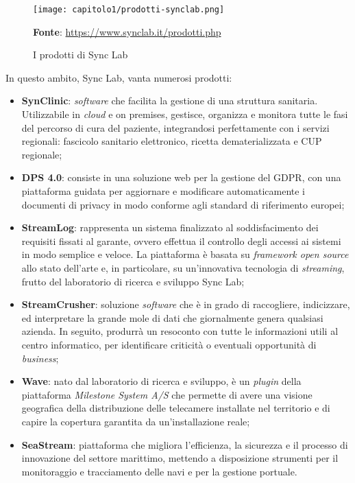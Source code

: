 \begin{figure}[!h]
  \centering
  \texttt{[image: capitolo1/prodotti-synclab.png]}
  \caption{I prodotti di Sync Lab}
  \textbf{Fonte}: \href{https://www.synclab.it/prodotti.php}{https://www.synclab.it/prodotti.php}
\end{figure}

In questo ambito, Sync Lab, vanta numerosi prodotti:
\begin{itemize}
  \item \textbf{SynClinic}: \emph{software} che facilita la gestione di una struttura sanitaria. Utilizzabile in \emph{cloud} e \gls{on premises}, gestisce, organizza e monitora tutte le fasi del percorso di cura del paziente, integrandosi perfettamente con i servizi regionali: fascicolo sanitario elettronico, ricetta dematerializzata e CUP regionale;
  
  \item \textbf{DPS 4.0}: consiste in una soluzione web per la gestione del GDPR, con una piattaforma guidata per aggiornare e modificare automaticamente i documenti di privacy in modo conforme agli standard di riferimento europei;
  
  \item \textbf{StreamLog}: rappresenta un sistema finalizzato al soddisfacimento dei requisiti fissati al garante, ovvero effettua il controllo degli accessi ai sistemi in modo semplice e veloce. La piattaforma è basata su \emph{framework open source} allo stato dell'arte e, in particolare, su un'innovativa tecnologia di \emph{streaming}, frutto del laboratorio di ricerca e sviluppo Sync Lab;
  
  \item \textbf{StreamCrusher}: soluzione \emph{software} che è in grado di raccogliere, indicizzare, ed interpretare la grande mole di dati che giornalmente genera qualsiasi azienda. In seguito, produrrà un resoconto con tutte le informazioni utili al centro informatico, per identificare criticità o eventuali opportunità di \emph{business};
  
  \item \textbf{Wave}: nato dal laboratorio di ricerca e sviluppo, è un \emph{plugin} della piattaforma \emph{Milestone System A/S} che permette di avere una visione geografica della distribuzione delle telecamere installate nel territorio e di capire la copertura garantita da un'installazione reale;
  
  \item \textbf{SeaStream}: piattaforma che migliora l'efficienza, la sicurezza e il processo di innovazione del settore marittimo, mettendo a disposizione strumenti per il monitoraggio e tracciamento delle navi e per la gestione portuale.  
\end{itemize}

